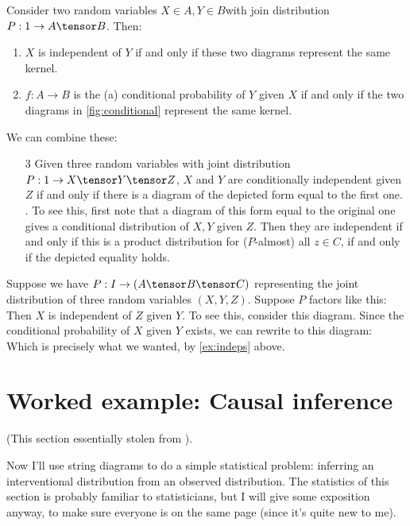 \documentclass{article}
\begin{document}
\begin{example}
    Consider two random variables $X\in A,Y\in B$with join distribution $P: 1 \to A \tensor B$. Then:
    \begin{enumerate}
        \item $X$ is independent of $Y$ if and only if these two diagrams represent the same kernel.
        \item $f:A \to B$ is the (a) conditional probability of $Y$ given $X$ if and only if the two diagrams in \cref{fig:conditional} represent the same kernel.
    \end{enumerate}
    We can combine these:
    \begin{enumerate}
        \item[3] Given three random variables with joint distribution $P: 1 \to X \tensor Y \tensor Z$, $X$ and $Y$ are conditionally independent given $Z$ if and only if there is a diagram of the depicted form equal to the first one. .
        To see this, first note that a diagram of this form equal to the original one gives a conditional distribution of $X,Y$ given $Z$.
        Then they are independent if and only if this is a product distribution for ($P$-almost) all $z\in C$, if and only if the depicted equality holds.
    \end{enumerate}
\label{ex:indeps}
\end{example}
\begin{example}
    Suppose we have $P: I \to (A \tensor B \tensor C)$ representing the joint distribution of three random variables $(X,Y,Z)$.
    Suppose $P$ factors like this:
    Then $X$ is independent of $Z$ given $Y$.
    To see this, consider this diagram.
    Since the conditional probability of $X$ given $Y$ exists, we can rewrite to this diagram:
    Which is precisely what we wanted, by \cref{ex:indeps} above.
\end{example}


\section{Worked example: Causal inference}
(This section essentially stolen from \cite{CausalSurgery}).

Now I'll use string diagrams to do a simple statistical problem: inferring an interventional distribution from an observed distribution.
The statistics of this section is probably familiar to statisticians, but I will give some exposition anyway, to make sure everyone is on the same page (since it's quite new to me).
\end{document}
